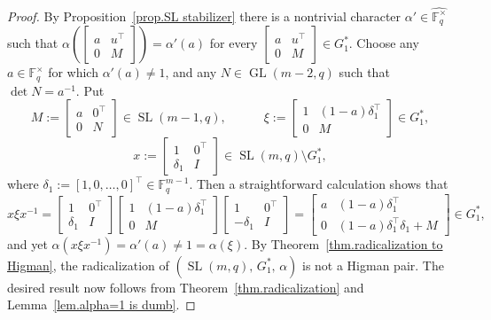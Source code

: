 \begin{proof}
By Proposition~\ref{prop.SL stabilizer} there is a nontrivial character $\alpha' \in \widehat{ \mathbb{F}_q^\times}$ such that $\alpha\left(\begin{bmatrix}
a&u^\top\\0&M
\end{bmatrix}\right)
=\alpha'(a)$ for every $\begin{bmatrix}
a&u^\top\\0&M
\end{bmatrix} \in G_1^*$.
Choose any $a \in \mathbb{F}_q^\times$ for which $\alpha'(a) \neq 1$, and any $N \in \operatorname{GL}(m-2,q)$ such that $\det N = a^{-1}$.
Put
\[ M := \begin{bmatrix} a & 0^\top \\ 0 & N \end{bmatrix} \in \operatorname{SL}(m-1,q), \qquad \quad
\xi := \begin{bmatrix} 1 & (1-a)\delta_1^\top \\ 0 & M \end{bmatrix} \in G_1^*, \]
\[
x := \begin{bmatrix} 1 & 0^\top \\ \delta_1 & I \end{bmatrix} \in \operatorname{SL}(m,q) \setminus G_1^*,
\]
where $\delta_1 := [1,0,\dotsc,0]^\top \in \mathbb{F}_q^{m-1}$.
Then a straightforward calculation shows that
\[ x\xi x^{-1} 
=\begin{bmatrix} 1 & 0^\top \\ \delta_1 & I \end{bmatrix}
\begin{bmatrix} 1 & (1-a)\delta_1^\top \\ 0 & M \end{bmatrix}
\begin{bmatrix} 1 & 0^\top \\ -\delta_1 & I \end{bmatrix}
=\begin{bmatrix} a & (1-a)\delta_1^\top \\ 0 & (1-a)\delta_1^\top \delta_1 + M \end{bmatrix}
\in G_1^*,
\]
and yet $\alpha(x\xi x^{-1}) = \alpha'(a) \neq 1 = \alpha(\xi)$.
By Theorem~\ref{thm.radicalization to Higman}, the radicalization of $(\operatorname{SL}(m,q),\, G_1^*,\, \alpha)$ is not a Higman pair.
The desired result now follows from Theorem~\ref{thm.radicalization} and Lemma~\ref{lem.alpha=1 is dumb}.
\end{proof}


